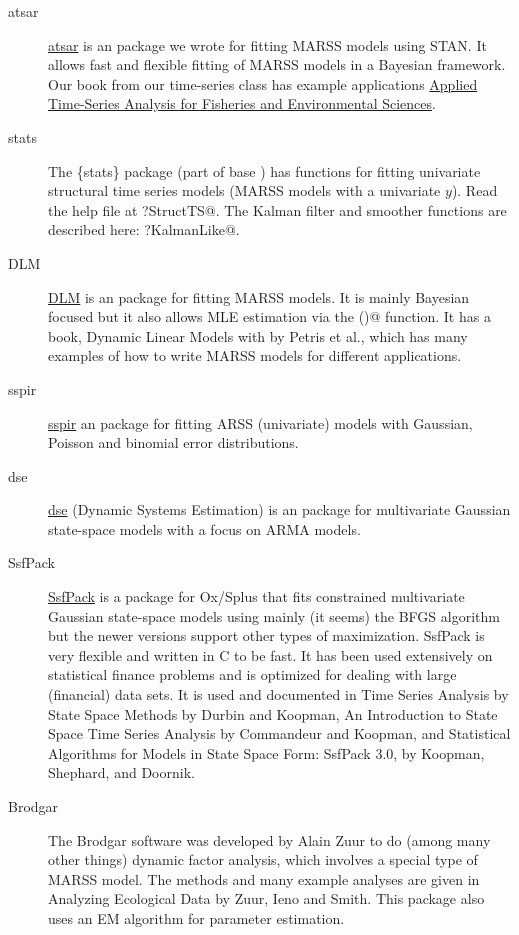 \begin{description}
	\item[atsar] \href{https://asts-es.github.io/atsar/}{atsar} is an \R package we wrote for fitting MARSS models using STAN.  It allows fast and flexible fitting of MARSS models in a Bayesian framework.  Our book from our time-series class has example applications \href{https://atsa-es.github.io/atsa-labs/}{Applied Time-Series Analysis for Fisheries and Environmental Sciences}.
	
  \item[stats] The \{stats\} package (part of base \R) has functions for fitting univariate structural time series models (MARSS models with a univariate $y$).  Read the help file at \verb@?StructTS@. The Kalman filter and smoother functions are described here: \verb@?KalmanLike@.
  
	\item[DLM] \href{https://cran.r-project.org/package=dlm}{DLM} is an \R package for fitting MARSS models.  It is mainly Bayesian focused but it also allows MLE estimation via the \verb@optim()@ function.  It has a book, Dynamic Linear Models with \R  by Petris et al., which has many examples of how to write MARSS models for different applications.
	
	\item[sspir] \href{https://cran.r-project.org/package=sspir}{sspir} an \R package for fitting ARSS (univariate) models with Gaussian, Poisson and binomial error distributions.  
	\item[dse] \href{https://cran.r-project.org/package=dse}{dse} (Dynamic Systems Estimation) is an \R package for multivariate Gaussian state-space models with a focus on ARMA models.
	\item[SsfPack] \href{http://www.ssfpack.com/}{SsfPack} is a package for Ox/Splus that fits constrained multivariate Gaussian state-space models using mainly (it seems) the BFGS algorithm but the newer versions support other types of maximization.  SsfPack is very flexible and written in C to be fast.  It has been used extensively on statistical finance problems and is optimized for dealing with large (financial) data sets.  It is used and documented in Time Series Analysis by State Space Methods by Durbin and Koopman, An Introduction to State Space Time Series Analysis by Commandeur and Koopman, and Statistical Algorithms for Models in State Space Form: SsfPack 3.0, by Koopman, Shephard, and Doornik.
	
	\item[Brodgar] The Brodgar software was developed by Alain Zuur to do (among many other things) dynamic factor analysis, which involves a special type of MARSS model.  The methods and many example analyses are given in Analyzing Ecological Data by Zuur, Ieno and Smith.  This package also uses an EM algorithm for parameter estimation.
	

\end{description}
